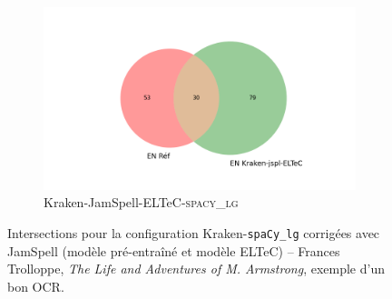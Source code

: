 \begin{figure}[H]
\begin{minipage}{7cm}
\begin{subfigure}{1\textwidth}
  \label{fig: }
  \end{subfigure}
  \end{minipage}
  \begin{minipage}{7cm}
  \begin{subfigure}{1\textwidth}
  \includegraphics[width=1\textwidth]{IMAGES/ELTeC_INTERSECTIONS_spaCy3.5.1/TROLLOPE_Adventure_Kraken_jamspell-ELTeCmodel-en.txt_spacy-lg-concat.json_intersection.png} 
  \caption{Kraken-JamSpell-ELTeC-\textsc{spacy\_lg}}
  \label{fig:}
  \end{subfigure}
    \end{minipage}
\caption{Intersections pour la configuration Kraken-\texttt{spaCy\_lg} corrigées avec JamSpell (modèle pré-entraîné et modèle ELTeC) -- Frances Trolloppe, \textit{The Life and Adventures of M. Armstrong}, exemple d'un bon OCR.}
\label{fig:TROLLOPPE_INTERSECTIONS}
\end{figure}
